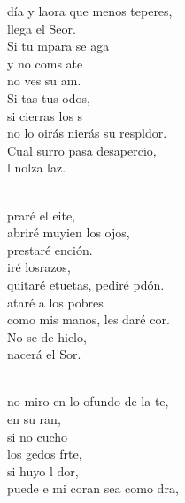 \begin{cancion}%
	día y laora que menos teperes,\\
	llega el Seor. \\
	Si tu mpara se aga  \\
	y no coms ate\\
	no ves su am. \\
	Si tas tus odos, \\
	si cierras los s\\
	no lo oirás nierás su respldor.\\
	Cual surro pasa desapercio,\\
	l nolza laz.\\\jump\\
	\begin{chorus}%
	praré el eite, \\
	abriré muyien los ojos, \\
	prestaré ención.\\
	iré losrazos, \\
	quitaré etuetas, pediré pdón.\\
	ataré a los pobres \\
	como mis manos, les daré cor.\\
	No se de hielo,  \\
	nacerá el Sor.\\
	\end{chorus}%
	\jump\\
	no miro en lo ofundo de la te, \\
	en su ran,\\
	si no cucho \\
	los gedos  frte,\\
	si huyo l dor,\\
	puede e mi coran sea como dra, \\

\end{cancion}

